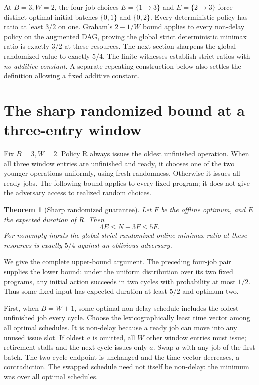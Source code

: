 \documentclass[11pt]{article}
\newtheorem{theorem}{Theorem}
\begin{document}
At $B=3,W=2$, the four-job choices $E=\{1\to3\}$ and
$E=\{2\to3\}$ force distinct optimal initial batches $\{0,1\}$ and
$\{0,2\}$. Every deterministic policy has ratio at least $3/2$ on one.
Graham's $2-1/W$ bound applies to every non-delay policy on the augmented
DAG, proving the global strict deterministic minimax ratio is exactly
$3/2$ at these resources. The next section sharpens the global randomized
value to exactly $5/4$. The finite witnesses establish strict ratios with
\emph{no additive constant}. A separate repeating construction below
also settles the definition allowing a fixed additive constant.

\section{The sharp randomized bound at a three-entry window}
Fix $B=3,W=2$. Policy R always issues the oldest unfinished operation.
When all three window entries are unfinished and ready, it chooses one of
the two younger operations uniformly, using fresh randomness. Otherwise it
issues all ready jobs. The following bound applies to every fixed program;
it does not give the adversary access to realized random choices.

\begin{theorem}[Sharp randomized guarantee]
Let $F$ be the offline optimum, and $E$ the expected duration of R. Then
\[
 4E\le N+3F\le5F.
\]
For nonempty inputs the global strict randomized online minimax ratio at
these resources is exactly $5/4$ against an oblivious adversary.
\end{theorem}
We give the complete upper-bound argument. The preceding four-job pair
supplies the lower bound: under the uniform distribution over its two
fixed programs, any initial action succeeds in two cycles with probability
at most $1/2$. Thus some fixed input has expected duration at least $5/2$
and optimum two.

First, when $B=W+1$, some optimal non-delay schedule includes the oldest
unfinished job every cycle. Choose the lexicographically least time vector
among all optimal schedules. It is non-delay because a ready job can move
into any unused issue slot. If oldest $a$ is omitted, all $W$ other window
entries must issue; retirement stalls and the next cycle issues only $a$.
Swap $a$ with any job of the first batch. The two-cycle endpoint is unchanged
and the time vector decreases, a contradiction. The swapped schedule need
not itself be non-delay: the minimum was over all optimal schedules.
\end{document}
